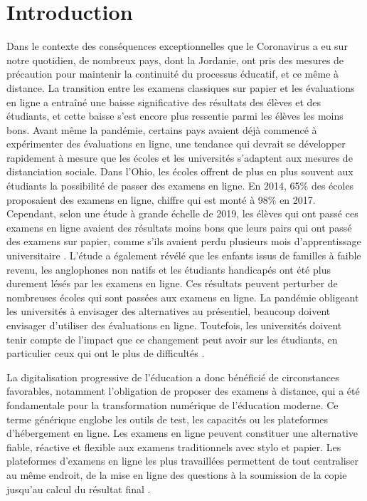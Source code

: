 \documentclass[french]{textolivre}
\begin{document}
\section{Introduction}
Dans le contexte des conséquences exceptionnelles que le Coronavirus a eu sur notre quotidien, de nombreux pays, dont la Jordanie, ont pris des mesures de précaution pour maintenir la continuité du processus éducatif, et ce même à distance. La transition entre les examens classiques sur papier et les évaluations en ligne a entraîné une baisse significative des résultats des élèves et des étudiants, et cette baisse s’est encore plus ressentie parmi les élèves les moins bons. Avant même la pandémie, certains pays avaient déjà commencé à expérimenter des évaluations en ligne, une tendance qui devrait se développer rapidement à mesure que les écoles et les universités s'adaptent aux mesures de distanciation sociale. Dans l'Ohio, les écoles offrent de plus en plus souvent aux étudiants la possibilité de passer des examens en ligne. En 2014, 65\% des écoles proposaient des examens en ligne, chiffre qui est monté à 98\% en 2017. Cependant, selon une étude à grande échelle de 2019, les élèves qui ont passé ces examens en ligne avaient des résultats moins bons que leurs pairs qui ont passé des examens sur papier, comme s'ils avaient perdu plusieurs mois d'apprentissage universitaire \cite{daniel_education_2020}. L'étude a également révélé que les enfants issus de familles à faible revenu, les anglophones non natifs et les étudiants handicapés ont été plus durement lésés par les examens en ligne. Ces résultats peuvent perturber de nombreuses écoles qui sont passées aux examens en ligne. La pandémie obligeant les universités à envisager des alternatives au présentiel, beaucoup doivent envisager d’utiliser des évaluations en ligne. Toutefois, les universités doivent tenir compte de l'impact que ce changement peut avoir sur les étudiants, en particulier ceux qui ont le plus de difficultés \cite{giannini2020reopening}.

La digitalisation progressive de l'éducation a donc bénéficié de circonstances favorables, notamment l’obligation de proposer des examens à distance, qui a été fondamentale pour la transformation numérique de l'éducation moderne. Ce terme générique englobe les outils de test, les capacités ou les plateformes d'hébergement en ligne. Les examens en ligne peuvent constituer une alternative fiable, réactive et flexible aux examens traditionnels avec stylo et papier. Les plateformes d’examens en ligne les plus travaillées permettent de tout centraliser au même endroit, de la mise en ligne des questions à la soumission de la copie jusqu’au calcul du résultat final \cite{correl2020evaluacion}.
\end{document}
